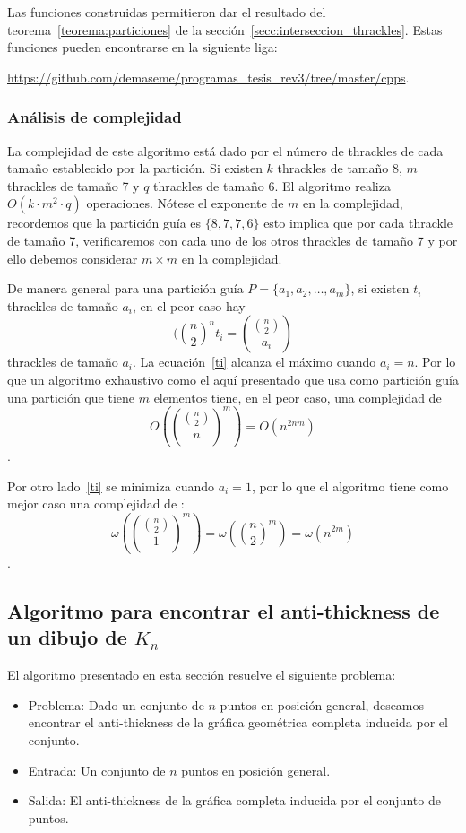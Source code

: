   Las funciones construidas permitieron dar el resultado del
  teorema~\ref{teorema:particiones} de la sección~\ref{secc:interseccion_thrackles}.
  Estas funciones pueden encontrarse en la siguiente liga:

  \url{https://github.com/demaseme/programas_tesis_rev3/tree/master/cpps}.

  \subsubsection{Análisis de complejidad}
  La complejidad de este algoritmo está dado por el número de thrackles de cada
  tamaño establecido por la partición. Si existen $k$ thrackles de tamaño 8, $m$
  thrackles de tamaño 7 y $q$ thrackles de tamaño 6. El algoritmo realiza $O(k\cdot
  m^2 \cdot q)$ operaciones. Nótese el exponente de $m$ en la complejidad, recordemos que
  la partición guía es $\{8,7,7,6\}$ esto implica que por cada thrackle de tamaño 7, verificaremos
  con cada uno de los otros thrackles de tamaño 7 y por ello debemos considerar $m\times m$ en la
  complejidad.

  De manera general para una partición guía $P=\{a_1,a_2,\dots,a_m\}$, si existen $t_i$
  thrackles de tamaño $a_i$, en el peor caso hay
  \begin{equation} \label{ti}(\binom{n}{2}^n
    t_i=\displaystyle \binom{\binom{n}{2}}{a_i}
  \end{equation}
  thrackles de tamaño $a_i$. La ecuación~\ref{ti} alcanza el máximo cuando $a_i=n$. Por lo que
  un algoritmo exhaustivo como el aquí presentado que usa como partición guía una partición que tiene $m$
  elementos tiene, en el peor caso, una complejidad de
  \[O\left(\binom{\binom{n}{2}}{n}^m\right) = O(n^{2nm}) \].

  Por otro lado~\ref{ti} se minimiza cuando $a_i=1$, por lo que el algoritmo tiene como mejor caso una complejidad de :
  \[\omega\left(\binom{\binom{n}{2}}{1}^m\right)= \omega\left( \binom{n}{2}^m\right) = \omega(n^{2m})\].

\subsection{Algoritmo para encontrar el anti-thickness de un dibujo de
$K_n$}\label{secc:anti-thickness-dibujo}

  El algoritmo presentado en esta sección resuelve el siguiente problema:
  \begin{itemize}
    \item[] Problema: Dado un conjunto de $n$ puntos en posición general, deseamos encontrar el
    anti-thickness de la gráfica geométrica completa inducida por el conjunto.
    \item[] Entrada: Un conjunto de $n$ puntos en posición general.
    \item[] Salida: El anti-thickness de la gráfica completa inducida por el conjunto de puntos.
  \end{itemize}

